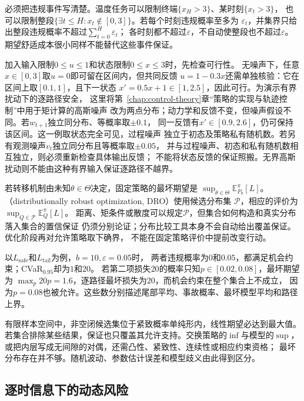 必须把违规事件写清楚。温度任务可以限制终端$\{x_H>3\}$、某时刻$\{x_t>3\}$，
也可以限制整段$\{\exists t\leq H:x_t\notin[0,3]\}$。若每个时刻违规概率至多为
$\varepsilon_t$，并集界只给出整段违规概率不超过$\sum_{t=0}^H\varepsilon_t$；
各时刻都不超过$\varepsilon$，不自动使整段也不超过$\varepsilon$。
期望舒适成本很小同样不能替代这些事件保证。

加入输入限制$0\leq u\leq1$和状态限制$0\leq x\leq3$时，先检查可行性。
无噪声下，任意$x\in[0,3]$取$u=0$即可留在区间内，但共同反馈
$u=1-0.3x$还需单独核验：它在区间上取$[0.1,1]$，且下一状态
$x'=0.5x+1\in[1,2.5]$，因此可行。为演示有界扰动下的逐路径安全，
这里将第~\ref{chap:control-theory}章“策略的实现与轨迹控制”中用于矩计算的高斯噪声
改为两点分布；动力学和反馈不变，但噪声假设不同。若$w_{t+1}$独立同分布、等概率取$\pm0.1$，
同一反馈有$x'\in[0.9,2.6]$，仍可保持该区间。这一例取状态完全可见，过程噪声
独立于初态及策略私有随机数。若另有观测噪声$v_t$独立同分布且等概率取$\pm0.05$，
并与过程噪声、初态和私有随机数相互独立，则必须重新检查具体输出反馈；
不能将状态反馈的保证照搬。无界高斯扰动则不能由这种有界输入保证逐路径不越界。

若转移机制由未知$\theta\in\Theta$决定，固定策略的最坏期望是
$\sup_{\theta\in\Theta}\mathbb E^\pi_{P_\theta}[L]$。
（distributionally robust optimization, DRO）使用候选分布集
$\mathcal P$，相应的评价为$\sup_{Q\in\mathcal P}\mathbb E^\pi_Q[L]$。
距离、矩条件或散度可以规定$\mathcal P$，但集合如何构造和真实分布落入集合的置信保证
仍须分别论证；分布比较工具本身不会自动给出覆盖保证。优化阶段再对允许策略取下确界，
不能在固定策略评价中提前改变行动。

以$L_{\mathrm{safe}}$和$L_{\mathrm{tail}}$为例，$b=10,\varepsilon=0.05$时，
两者违规概率为$0$和$0.05$，都满足机会约束；CVaR$_{0.95}$却为$1$和$20$。
若第二项损失$20$的概率只知$p\in[0.02,0.08]$，最坏期望为
$\max_p20p=1.6$，逐路径最坏损失为$20$，而机会约束在整个集合上不成立，
因为$p=0.08$也被允许。这些数分别描述尾部平均、事故概率、最坏模型平均和路径上界。

有限样本空间中，非空闭候选集位于紧致概率单纯形内，线性期望必达到最大值。
若集合排除某些结果，保证也只覆盖其允许支持。交换策略的$\inf$与模型的$\sup$，
或把内层写成无间隙的对偶，还需凸性、紧致性、连续性或相应约束资格；
最坏分布存在并不够。随机波动、参数估计误差和模型歧义由此得到区分。

\subsection{逐时信息下的动态风险}
\label{sec:decision-dynamic-risk-time-consistency}

